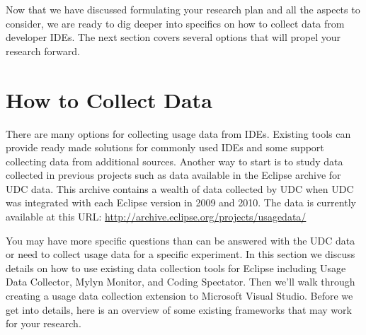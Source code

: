 Now that we have discussed formulating your research plan and all the aspects to consider, we are ready to dig deeper into specifics on how to collect data from developer IDEs.  The next section covers several options that will propel your research forward.

\section{How to Collect Data}
\label{SecHowToCollectData}

There are many options for collecting usage data from IDEs.   Existing tools can provide ready made solutions for commonly used IDEs and some support collecting data from additional sources.   Another way to start is to study data collected in previous projects such as data available in the Eclipse archive for UDC data.  This archive contains a wealth of data collected by UDC when UDC was integrated with each Eclipse version in 2009 and 2010.  The data is currently available at this URL:
\url{http://archive.eclipse.org/projects/usagedata/}

You may have more specific questions than can be answered with the UDC data or need to collect usage data for a specific experiment.  In this section we discuss details on how to use existing data collection tools for Eclipse including Usage Data Collector, Mylyn Monitor, and Coding Spectator.  Then we'll walk through creating a usage data collection extension to Microsoft Visual Studio.  Before we get into details, here is an overview of some existing frameworks that may work for your research.

